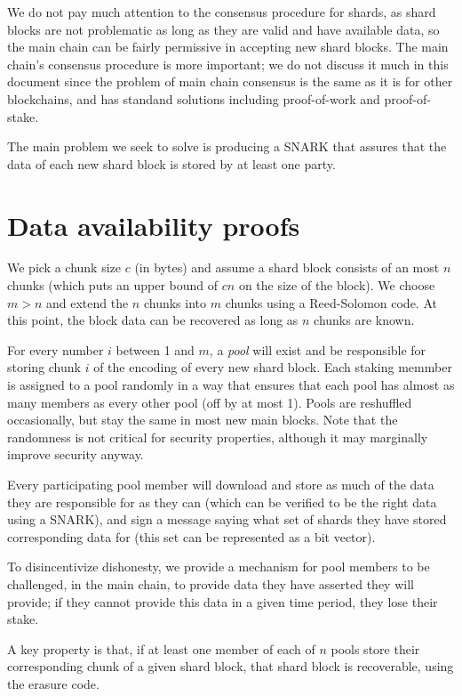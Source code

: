 \documentclass{article}
\begin{document}
We do not pay much attention to the consensus procedure for shards, as shard blocks are not problematic as long as they are valid and have available data, so the main chain can be fairly permissive in accepting new shard blocks.  The main chain's consensus procedure is more important; we do not discuss it much in this document since the problem of main chain consensus is the same as it is for other blockchains, and has standand solutions including proof-of-work and proof-of-stake.

The main problem we seek to solve is producing a SNARK that assures that the data of each new shard block is stored by at least one party.

\section{Data availability proofs}

We pick a chunk size $c$ (in bytes) and assume a shard block consists of an most $n$ chunks (which puts an upper bound of $cn$ on the size of the block).  We choose $m > n$ and extend the $n$ chunks into $m$ chunks using a Reed-Solomon code.  At this point, the block data can be recovered as long as $n$ chunks are known.

For every number $i$ between 1 and $m$, a \emph{pool} will exist and be responsible for storing chunk $i$ of the encoding of every new shard block.  Each staking memmber is assigned to a pool randomly in a way that ensures that each pool has almost as many members as every other pool (off by at most 1).  Pools are reshuffled occasionally, but stay the same in most new main blocks.  Note that the randomness is not critical for security properties, although it may marginally improve security anyway.


Every participating pool member will download and store as much of the data they are responsible for as they can (which can be verified to be the right data using a SNARK), and sign a message
saying what set of shards they have stored corresponding data for (this set can be represented as a bit vector).

To disincentivize dishonesty, we provide a mechanism for pool members to be challenged, in the main chain, to provide data they have asserted they will provide; if they cannot provide this data in a given time period, they lose their stake.

A key property is that, if at least one member of each of $n$ pools store their corresponding chunk of a given shard block, that shard block is recoverable, using the erasure code.
\end{document}
